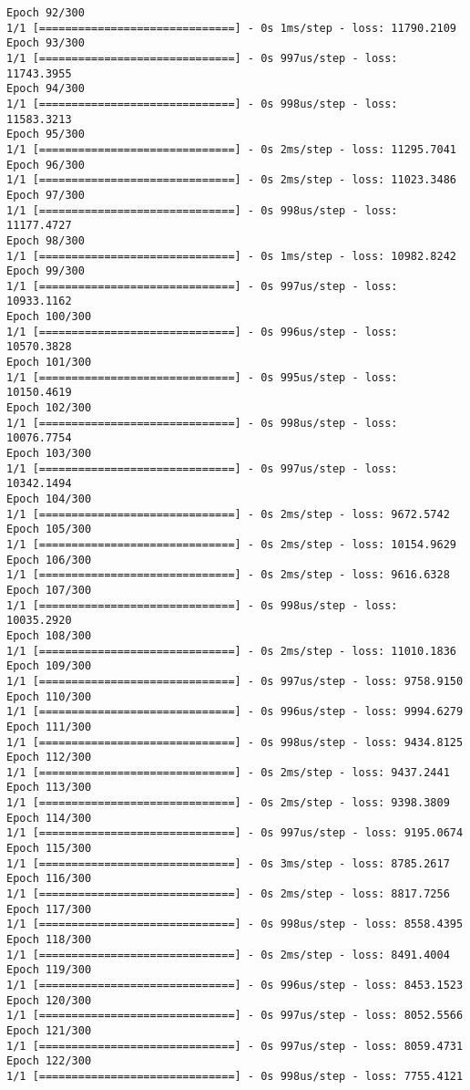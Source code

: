 \documentclass[11pt]{article}
\begin{document}
\begin{Verbatim}[commandchars=\\\{\}]
Epoch 92/300
1/1 [==============================] - 0s 1ms/step - loss: 11790.2109
Epoch 93/300
1/1 [==============================] - 0s 997us/step - loss: 11743.3955
Epoch 94/300
1/1 [==============================] - 0s 998us/step - loss: 11583.3213
Epoch 95/300
1/1 [==============================] - 0s 2ms/step - loss: 11295.7041
Epoch 96/300
1/1 [==============================] - 0s 2ms/step - loss: 11023.3486
Epoch 97/300
1/1 [==============================] - 0s 998us/step - loss: 11177.4727
Epoch 98/300
1/1 [==============================] - 0s 1ms/step - loss: 10982.8242
Epoch 99/300
1/1 [==============================] - 0s 997us/step - loss: 10933.1162
Epoch 100/300
1/1 [==============================] - 0s 996us/step - loss: 10570.3828
Epoch 101/300
1/1 [==============================] - 0s 995us/step - loss: 10150.4619
Epoch 102/300
1/1 [==============================] - 0s 998us/step - loss: 10076.7754
Epoch 103/300
1/1 [==============================] - 0s 997us/step - loss: 10342.1494
Epoch 104/300
1/1 [==============================] - 0s 2ms/step - loss: 9672.5742
Epoch 105/300
1/1 [==============================] - 0s 2ms/step - loss: 10154.9629
Epoch 106/300
1/1 [==============================] - 0s 2ms/step - loss: 9616.6328
Epoch 107/300
1/1 [==============================] - 0s 998us/step - loss: 10035.2920
Epoch 108/300
1/1 [==============================] - 0s 2ms/step - loss: 11010.1836
Epoch 109/300
1/1 [==============================] - 0s 997us/step - loss: 9758.9150
Epoch 110/300
1/1 [==============================] - 0s 996us/step - loss: 9994.6279
Epoch 111/300
1/1 [==============================] - 0s 998us/step - loss: 9434.8125
Epoch 112/300
1/1 [==============================] - 0s 2ms/step - loss: 9437.2441
Epoch 113/300
1/1 [==============================] - 0s 2ms/step - loss: 9398.3809
Epoch 114/300
1/1 [==============================] - 0s 997us/step - loss: 9195.0674
Epoch 115/300
1/1 [==============================] - 0s 3ms/step - loss: 8785.2617
Epoch 116/300
1/1 [==============================] - 0s 2ms/step - loss: 8817.7256
Epoch 117/300
1/1 [==============================] - 0s 998us/step - loss: 8558.4395
Epoch 118/300
1/1 [==============================] - 0s 2ms/step - loss: 8491.4004
Epoch 119/300
1/1 [==============================] - 0s 996us/step - loss: 8453.1523
Epoch 120/300
1/1 [==============================] - 0s 997us/step - loss: 8052.5566
Epoch 121/300
1/1 [==============================] - 0s 997us/step - loss: 8059.4731
Epoch 122/300
1/1 [==============================] - 0s 998us/step - loss: 7755.4121

\end{Verbatim}
\end{document}

